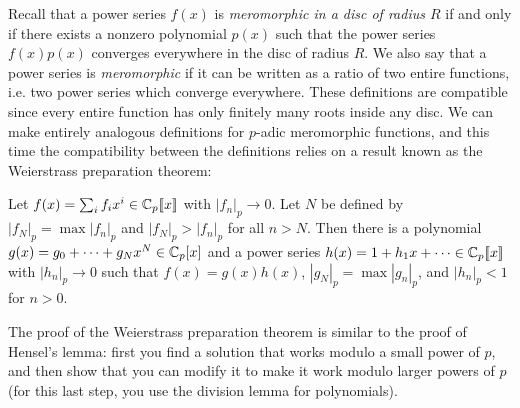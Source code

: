 Recall that a power series $f(x)$ is \emph{meromorphic in a disc of radius $R$} if and only if there exists a nonzero polynomial $p(x)$ such that the power series $f(x)p(x)$ converges everywhere in the disc of radius $R$. We also say that a power series is \emph{meromorphic} if it can be written as a ratio of two entire functions, i.e. two power series which converge everywhere. These definitions are compatible since every entire function has only finitely many roots inside any disc. We can make entirely analogous definitions for $p$-adic meromorphic functions, and this time the compatibility between the definitions relies on a result known as the Weierstrass preparation theorem:

\begin{prop} Let $f(x) = \sum_i f_i x^i \in \mathbb{C}_p[\![x]\!]$ with $|f_n|_p \rightarrow 0$. Let $N$ be defined by $|f_N|_p = \max |f_n|_p$ and $|f_N|_p > |f_n|_p$ for all $n > N$. Then there is a polynomial $g(x) = g_0 + \cdots + g_Nx^N \in \mathbb{C}_p[x]$ and a power series $h(x) = 1 + h_1x + \cdots \in \mathbb{C}_p[\![x]\!]$ with $|h_n|_p \rightarrow 0$ such that $f(x) = g(x)h(x)$, $|g_N|_p = \max |g_n|_p$, and $|h_n|_p < 1$ for $n > 0$.
\end{prop}

The proof of the Weierstrass preparation theorem is similar to the proof of Hensel's lemma: first you find a solution that works modulo a small power of $p$, and then show that you can modify it to make it work modulo larger powers of $p$ (for this last step, you use the division lemma for polynomials).

